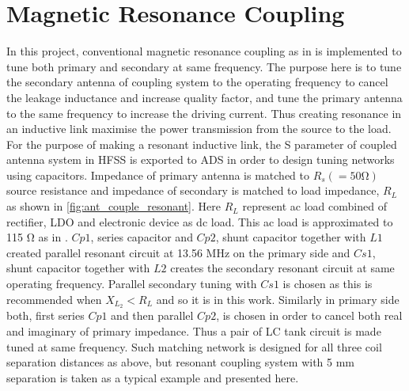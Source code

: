 \documentclass[12pt,a4paper,UKenglish]{report}
\begin{document}
\section{Magnetic Resonance Coupling}  	%

In this project, conventional magnetic resonance coupling as in is implemented to tune both primary and secondary 
at same frequency. The purpose here is to tune the secondary antenna of 
coupling system to the operating frequency to cancel the leakage inductance and increase quality factor, and tune the primary antenna to the same 
frequency to increase the 
driving current. Thus creating resonance in an inductive link maximise the power transmission from the source to  the load.  \\


For the purpose of making a resonant inductive link, the S parameter of coupled antenna system in HFSS 
is exported to ADS in order to design tuning networks using capacitors. Impedance of  primary antenna is 
matched to $ R_{s}(=50 \si{\ohm}) $ source resistance and impedance of secondary is matched to load impedance, 
$R_{L}$ as shown in \ref{fig:ant_couple_resonant}. Here $R_{L}$ represent ac load combined of rectifier, LDO and electronic device as dc load. This ac load 
is approximated to 115 \si{\ohm} as in \cite{koen_robert_2009}. $Cp1$, series capacitor and $Cp2$, shunt capacitor together 
with $L1$ created parallel resonant circuit at 13.56 MHz on the primary side and $Cs1$, shunt capacitor together with $L2$ 
creates the secondary resonant circuit at same operating frequency. Parallel secondary tuning with $Cs1$ is chosen as this is 
recommended when $X_{L_{2}} < R_{L}$ and so it is in this work. Similarly in primary side both, first series 
$Cp1$ and then parallel $Cp2$, is chosen in order to cancel both real and imaginary of primary impedance\cite{single_element_matching}. Thus a pair of LC tank circuit is made tuned at same 
frequency. Such matching network is designed for all three coil separation distances as above, but resonant coupling system 
with 5 mm separation is taken as a typical example and presented here. \\
\end{document}
